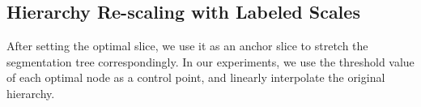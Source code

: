 % 
% 
% 
% 
% 
% 
% 
%   

\subsection{Hierarchy Re-scaling with Labeled Scales} 
After setting the optimal slice, we use it as an anchor slice to
stretch the segmentation tree correspondingly. In our experiments, we use the
threshold value of each optimal node as a control point, and linearly
interpolate the original hierarchy.

